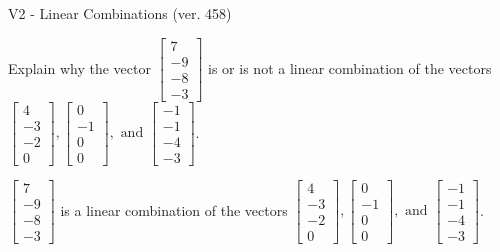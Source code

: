 \begin{exercise}
  \begin{exerciseTitle}V2 - Linear Combinations (ver. 458)\end{exerciseTitle}
  \begin{exerciseStatement}
    Explain why the vector \(\left[\begin{array}{c}
7 \\
-9 \\
-8 \\
-3
\end{array}\right]\)  is or is not a linear 
	combination of the vectors \(\left[\begin{array}{c}
4 \\
-3 \\
-2 \\
0
\end{array}\right] , \left[\begin{array}{c}
0 \\
-1 \\
0 \\
0
\end{array}\right] , \text{ and } \left[\begin{array}{c}
-1 \\
-1 \\
-4 \\
-3
\end{array}\right]\).
	


  \end{exerciseStatement}
  \begin{exerciseAnswer}
   \(\left[\begin{array}{c}
7 \\
-9 \\
-8 \\
-3
\end{array}\right]\) 
  	 is  
	a linear combination of the vectors \(\left[\begin{array}{c}
4 \\
-3 \\
-2 \\
0
\end{array}\right] , \left[\begin{array}{c}
0 \\
-1 \\
0 \\
0
\end{array}\right] , \text{ and } \left[\begin{array}{c}
-1 \\
-1 \\
-4 \\
-3
\end{array}\right]\).

	
  


  \end{exerciseAnswer}
\end{exercise}